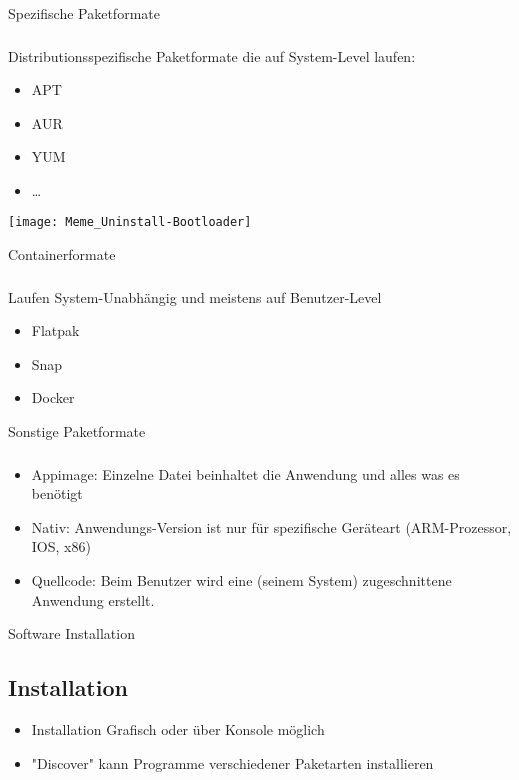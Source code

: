 \begin{frame}{Spezifische Paketformate}
    \subsubsection{}\label{subsubsec:spezifische-formate}

        Distributionsspezifische Paketformate die auf System-Level laufen:
        \begin{itemize}
            \item APT
            \item AUR
            \item YUM
            \item \ldots
        \end{itemize}
    \endminipage\hfill
        \texttt{[image: Meme\_Uninstall-Bootloader]}
    \endminipage\hfill
\end{frame}

\begin{frame}{Containerformate}
    \subsubsection{}\label{subsubsec:containerformate}

    Laufen System-Unabhängig und meistens auf Benutzer-Level

    \begin{itemize}
        \item Flatpak
        \item Snap
        \item Docker
    \end{itemize}

\end{frame}

\begin{frame}{Sonstige Paketformate}
    \subsubsection{}\label{subsubsec:sonstige-paketformate}

    \begin{itemize}
        \item Appimage: Einzelne Datei beinhaltet die Anwendung und alles was es benötigt
        \item Nativ: Anwendungs-Version ist nur für spezifische Geräteart (ARM-Prozessor, IOS, x86)
        \item Quellcode: Beim Benutzer wird eine (seinem System) zugeschnittene Anwendung erstellt.
    \end{itemize}

\end{frame}

\begin{frame}{Software Installation}
    \subsection{Installation}\label{subsec:installation}

    \begin{itemize}
        \item Installation Grafisch oder über Konsole möglich
        \item "Discover" kann Programme verschiedener Paketarten installieren
    \end{itemize}

\end{frame}